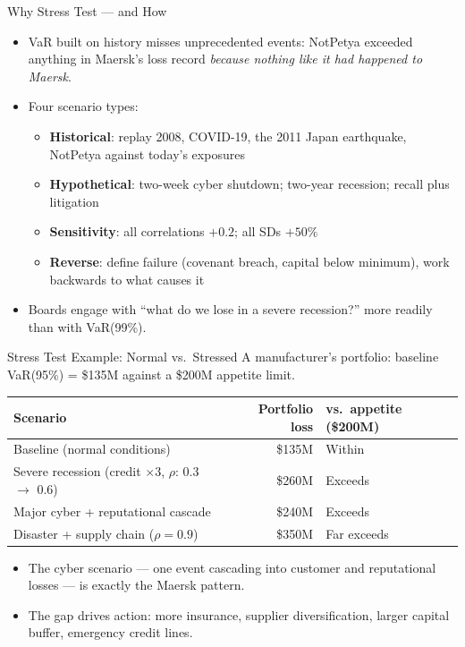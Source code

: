 \documentclass[11pt, aspectratio=169]{beamer}
\begin{document}
\begin{frame}{Why Stress Test --- and How}
\begin{itemize}
  \item VaR built on history misses unprecedented events: NotPetya exceeded anything in Maersk's loss record \emph{because nothing like it had happened to Maersk}.
  \item Four scenario types:
  \begin{itemize}
    \item \textbf{Historical}: replay 2008, COVID-19, the 2011 Japan earthquake, NotPetya against today's exposures
    \item \textbf{Hypothetical}: two-week cyber shutdown; two-year recession; recall plus litigation
    \item \textbf{Sensitivity}: all correlations $+0.2$; all SDs $+50\%$
    \item \textbf{Reverse}: define failure (covenant breach, capital below minimum), work backwards to what causes it
  \end{itemize}
  \item Boards engage with ``what do we lose in a severe recession?'' more readily than with VaR(99\%).
\end{itemize}
\end{frame}

\begin{frame}{Stress Test Example: Normal vs.\ Stressed}
A manufacturer's portfolio: baseline VaR(95\%) = \$135M against a \$200M appetite limit.
\medskip
\begin{center}
\small
\begin{tabular}{lrl}
\toprule
\textbf{Scenario} & \textbf{Portfolio loss} & \textbf{vs.\ appetite (\$200M)} \\
\midrule
Baseline (normal conditions) & \$135M & Within \\
Severe recession (credit $\times 3$, $\rho$: 0.3 $\to$ 0.6) & \$260M & Exceeds \\
Major cyber + reputational cascade & \$240M & Exceeds \\
Disaster + supply chain ($\rho = 0.9$) & \$350M & Far exceeds \\
\bottomrule
\end{tabular}
\end{center}
\medskip
\begin{itemize}
  \item The cyber scenario --- one event cascading into customer and reputational losses --- is exactly the Maersk pattern.
  \item The gap drives action: more insurance, supplier diversification, larger capital buffer, emergency credit lines.
\end{itemize}
\end{frame}
\end{document}
